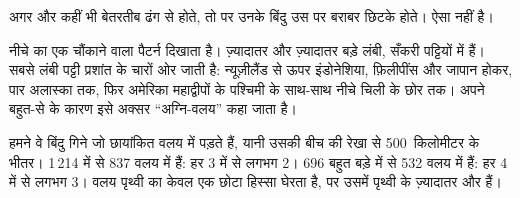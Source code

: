 अगर  और  कहीं भी बेतरतीब ढंग से होते, तो  पर उनके
बिंदु उस पर बराबर छिटके होते। ऐसा नहीं है।

नीचे का  एक चौंकाने वाला पैटर्न दिखाता है। ज़्यादातर  और
ज़्यादातर बड़े  लंबी, सँकरी पट्टियों में हैं। सबसे लंबी पट्टी प्रशांत
 के चारों ओर जाती है: न्यूज़ीलैंड से ऊपर इंडोनेशिया, फ़िलीपींस और जापान
होकर, पार अलास्का तक, फिर अमेरिका महाद्वीपों के पश्चिमी  के साथ-साथ नीचे
चिली के छोर तक। अपने बहुत-से  के कारण इसे अक्सर ``अग्नि-वलय''
कहा जाता है।

\begin{example}[मानचित्र पर गिनती]\label{ex:g4:volcanoes-earthquakes-first-look:shares}
हमने वे बिंदु गिने जो छायांकित वलय में पड़ते हैं, यानी उसकी बीच की रेखा
से 500~किलोमीटर के भीतर। 1\,214  में से 837 वलय में हैं: हर 3 में से
लगभग 2। 696 बहुत बड़े  में से 532 वलय में हैं: हर 4 में से लगभग 3। वलय
पृथ्वी का केवल एक छोटा हिस्सा घेरता है, पर उसमें पृथ्वी के ज़्यादातर 
और  हैं।
\end{example}

